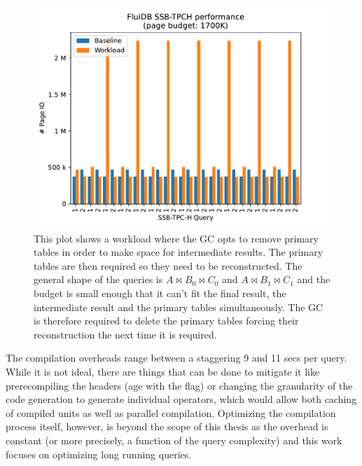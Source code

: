   \begin{figure}[H]
    \centering
    \includegraphics[width=.9\linewidth]{./plans/workload_1700K.pdf}
    \caption{\label{fig:gc_enemy}This plot shows a workload where the GC
      opts to remove primary tables in order to make space for
      intermediate results. The primary tables are then required so they
      need to be reconstructed. The general shape of the queries is
      \(A \Join B_0 \Join C_0\) and \(A \Join B_1 \Join C_1\) and the
      budget is small enough that it can't fit the final result, the
      intermediate result and the primary tables simultaneously. The GC
      is therefore required to delete the primary tables forcing their
      reconstruction the next time it is required.}
  \end{figure}


  The compilation overheads range between a staggering 9 and 11 secs
  per query. While it is not ideal, there are things that can be done
  to mitigate it like prerecompiling the headers (age with the
   flag) or changing the granularity of the code
  generation to generate individual operators, which would allow both
  caching of compiled units as well as parallel
  compilation. Optimizing the compilation process itself, however, is
  beyond the scope of this thesis as the overhead is constant (or more
  precisely, a function of the query complexity) and this work focuses
  on optimizing long running queries.

